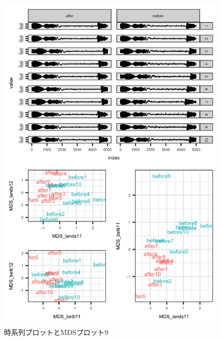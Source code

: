 \documentclass{jarticle}
\begin{document}
\begin{figure}[H]
	\begin{center}
		\includegraphics[width=15cm]{fig/MDS_plot9.png}
		\caption{時系列プロットとMDSプロット9}
		\label{fig:MDS_plot9}
	\end{center}
\end{figure}
\end{document}
